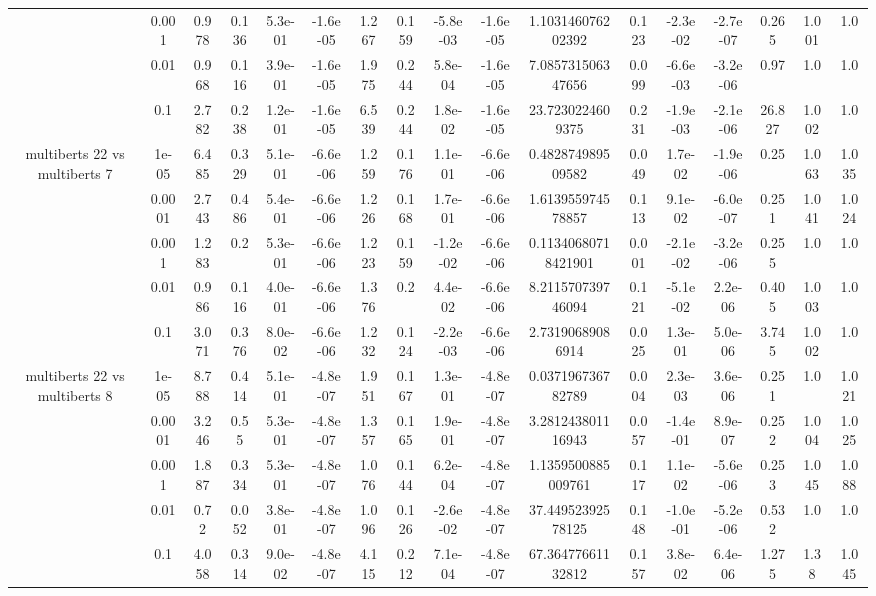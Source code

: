 \begin{tabular}{|c|c|c|c|c|c|c|c|c|c|c|c|c|c|c|c|c|}
 & 0.001 & 0.978 & 0.136 & 5.3e-01 & -1.6e-05 & 1.267 & 0.159 & -5.8e-03 & -1.6e-05 & 1.103146076202392 & 0.123 & -2.3e-02 & -2.7e-07 & 0.265 & 1.001 & 1.0 \\
 & 0.01 & 0.968 & 0.116 & 3.9e-01 & -1.6e-05 & 1.975 & 0.244 & 5.8e-04 & -1.6e-05 & 7.085731506347656 & 0.099 & -6.6e-03 & -3.2e-06 & 0.97 & 1.0 & 1.0 \\
 & 0.1 & 2.782 & 0.238 & 1.2e-01 & -1.6e-05 & 6.539 & 0.244 & 1.8e-02 & -1.6e-05 & 23.7230224609375 & 0.231 & -1.9e-03 & -2.1e-06 & 26.827 & 1.002 & 1.0 \\
\hline
\multirow{5}{*}{multiberts 22 vs multiberts 7} & 1e-05 & 6.485 & 0.329 & 5.1e-01 & -6.6e-06 & 1.259 & 0.176 & 1.1e-01 & -6.6e-06 & 0.482874989509582 & 0.049 & 1.7e-02 & -1.9e-06 & 0.25 & 1.063 & 1.035 \\
 & 0.0001 & 2.743 & 0.486 & 5.4e-01 & -6.6e-06 & 1.226 & 0.168 & 1.7e-01 & -6.6e-06 & 1.613955974578857 & 0.113 & 9.1e-02 & -6.0e-07 & 0.251 & 1.041 & 1.024 \\
 & 0.001 & 1.283 & 0.2 & 5.3e-01 & -6.6e-06 & 1.223 & 0.159 & -1.2e-02 & -6.6e-06 & 0.11340680718421901 & 0.001 & -2.1e-02 & -3.2e-06 & 0.255 & 1.0 & 1.0 \\
 & 0.01 & 0.986 & 0.116 & 4.0e-01 & -6.6e-06 & 1.376 & 0.2 & 4.4e-02 & -6.6e-06 & 8.211570739746094 & 0.121 & -5.1e-02 & 2.2e-06 & 0.405 & 1.003 & 1.0 \\
 & 0.1 & 3.071 & 0.376 & 8.0e-02 & -6.6e-06 & 1.232 & 0.124 & -2.2e-03 & -6.6e-06 & 2.73190689086914 & 0.025 & 1.3e-01 & 5.0e-06 & 3.745 & 1.002 & 1.0 \\
\hline
\multirow{5}{*}{multiberts 22 vs multiberts 8} & 1e-05 & 8.788 & 0.414 & 5.1e-01 & -4.8e-07 & 1.951 & 0.167 & 1.3e-01 & -4.8e-07 & 0.037196736782789 & 0.004 & 2.3e-03 & 3.6e-06 & 0.251 & 1.0 & 1.021 \\
 & 0.0001 & 3.246 & 0.55 & 5.3e-01 & -4.8e-07 & 1.357 & 0.165 & 1.9e-01 & -4.8e-07 & 3.281243801116943 & 0.057 & -1.4e-01 & 8.9e-07 & 0.252 & 1.004 & 1.025 \\
 & 0.001 & 1.887 & 0.334 & 5.3e-01 & -4.8e-07 & 1.076 & 0.144 & 6.2e-04 & -4.8e-07 & 1.1359500885009761 & 0.117 & 1.1e-02 & -5.6e-06 & 0.253 & 1.045 & 1.088 \\
 & 0.01 & 0.72 & 0.052 & 3.8e-01 & -4.8e-07 & 1.096 & 0.126 & -2.6e-02 & -4.8e-07 & 37.44952392578125 & 0.148 & -1.0e-01 & -5.2e-06 & 0.532 & 1.0 & 1.0 \\
 & 0.1 & 4.058 & 0.314 & 9.0e-02 & -4.8e-07 & 4.115 & 0.212 & 7.1e-04 & -4.8e-07 & 67.36477661132812 & 0.157 & 3.8e-02 & 6.4e-06 & 1.275 & 1.38 & 1.045 \\

\end{tabular}
